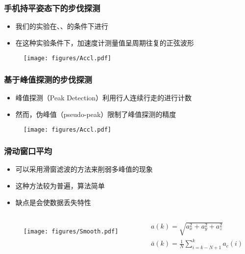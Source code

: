 \documentclass[10pt,xcolor=dvipsnames,fontset=none,punct=CCT]{ctexbeamer}
\begin{document}
\begin{frame}
  \frametitle{手机持平姿态下的步伐探测}
  \begin{itemize}
    \item 我们的实验在、、的条件下进行
    \item 在这种实验条件下，加速度计测量值呈周期往复的正弦波形\cite{Bassett2016}
  \end{itemize}
  \begin{figure}[ht]
    \centering
    \texttt{[image: figures/Accl.pdf]}
  \end{figure}
\end{frame}

\begin{frame}
  \frametitle{基于峰值探测的步伐探测}
  \begin{itemize}
    \item 峰值探测（Peak Detection）利用行人连续行走的进行计数
    \item 然而，伪峰值（pseudo-peak）限制了峰值探测的精度
  \end{itemize}
  \begin{figure}[ht]
    \centering
    \texttt{[image: figures/Accl.pdf]}
  \end{figure}
\end{frame}

\begin{frame}
  \frametitle{滑动窗口平均}
  \begin{itemize}
    \item 可以采用滑窗滤波的方法来削弱多峰值的现象\cite{Zhang2017}
    \item 这种方法较为普遍，算法简单
    \item 缺点是会使数据丢失特性
  \end{itemize}
  \begin{columns}
  \begin{figure}[ht]
    \centering
    \texttt{[image: figures/Smooth.pdf]}
  \end{figure}
  \begin{gather}
    a(k)=\sqrt{a_x^2+a_y^2+a_z^2}\\
    \bar{a}(k)=\frac{1}{N}\sum_{i=k-N+1}^ka_c(i)
  \end{gather}
  \end{columns}
\end{frame}
\end{document}
